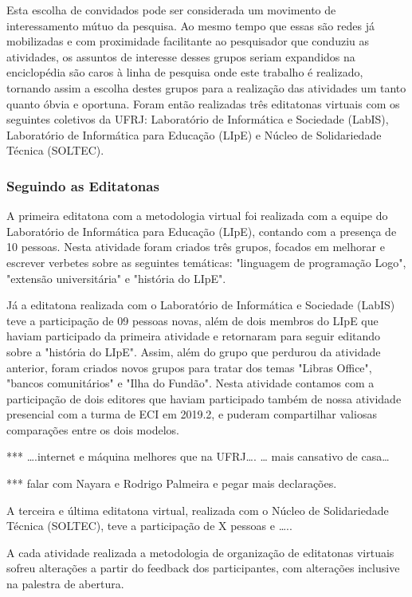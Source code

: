Esta escolha de convidados pode ser considerada um movimento de interessamento mútuo da pesquisa. Ao mesmo tempo que essas são redes já mobilizadas e com proximidade facilitante ao pesquisador que conduziu as atividades, os assuntos de interesse desses grupos seriam expandidos na enciclopédia são caros à linha de pesquisa onde este trabalho é realizado, tornando assim a escolha destes grupos para a realização das atividades um tanto quanto óbvia e oportuna.
 Foram então realizadas três editatonas virtuais com os seguintes coletivos da UFRJ: Laboratório de Informática e Sociedade (LabIS), Laboratório de Informática para Educação (LIpE) e Núcleo de Solidariedade Técnica (SOLTEC).
 
\subsubsection{Seguindo as Editatonas}

A primeira editatona com a metodologia virtual foi realizada com a equipe do Laboratório de Informática para Educação (LIpE), contando com a presença de 10 pessoas. Nesta atividade foram criados três grupos, focados em melhorar e escrever verbetes sobre as seguintes temáticas: "linguagem de programação Logo", "extensão universitária" e "história do LIpE".

Já a editatona realizada com o Laboratório de Informática e Sociedade (LabIS) teve a participação de 09 pessoas novas, além de dois membros do LIpE que haviam participado da primeira atividade e retornaram para seguir editando sobre a "história do LIpE". Assim, além do grupo que perdurou da atividade anterior, foram criados novos grupos para tratar dos temas "Libras Office", "bancos comunitários" e "Ilha do Fundão". Nesta atividade contamos com a participação de dois editores que haviam participado também de nossa atividade presencial com a turma de ECI em 2019.2, e puderam compartilhar valiosas comparações entre os dois modelos.

*** ….internet e máquina melhores que na UFRJ…. … mais cansativo de casa…

*** falar com Nayara e Rodrigo Palmeira e pegar mais declarações.

A terceira e última editatona virtual, realizada com o Núcleo de Solidariedade Técnica (SOLTEC), teve a participação de X pessoas e …..

A cada atividade realizada a metodologia de organização de editatonas virtuais sofreu alterações a partir do feedback dos participantes, com alterações inclusive na palestra de abertura.

